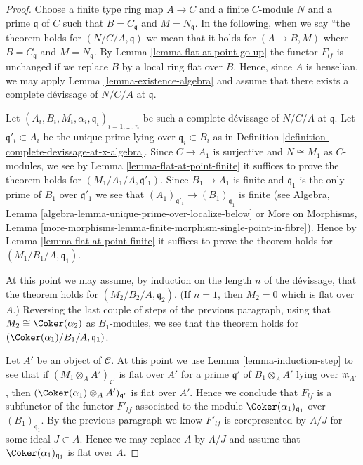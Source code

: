 \begin{proof}
Choose a finite type ring map $A \to C$ and a finite $C$-module $N$
and a prime $\mathfrak q$ of $C$ such that $B = C_{\mathfrak q}$
and $M = N_{\mathfrak q}$. In the following, when we say
``the theorem holds for $(N/C/A, \mathfrak q)$ we mean that
it holds for $(A \to B, M)$ where $B = C_{\mathfrak q}$ and
$M = N_{\mathfrak q}$. By
Lemma \ref{lemma-flat-at-point-go-up}
the functor $F_{lf}$ is unchanged if we replace $B$ by a local ring
flat over $B$. Hence, since $A$ is henselian, we may apply
Lemma \ref{lemma-existence-algebra}
and assume that there exists a complete d\'evissage of
$N/C/A$ at $\mathfrak q$.

\medskip\noindent
Let $(A_i, B_i, M_i, \alpha_i, \mathfrak q_i)_{i = 1, \ldots, n}$
be such a complete d\'evissage of $N/C/A$ at $\mathfrak q$. Let
$\mathfrak q'_i \subset A_i$ be the unique prime lying over
$\mathfrak q_i \subset B_i$ as in
Definition \ref{definition-complete-devissage-at-x-algebra}.
Since $C \to A_1$ is surjective and $N \cong M_1$ as $C$-modules,
we see by
Lemma \ref{lemma-flat-at-point-finite}
it suffices to prove the theorem holds for $(M_1/A_1/A, \mathfrak q'_1)$.
Since $B_1 \to A_1$ is finite and $\mathfrak q_1$ is the only prime
of $B_1$ over $\mathfrak q'_1$ we see that
$(A_1)_{\mathfrak q'_1} \to (B_1)_{\mathfrak q_1}$ is finite (see
Algebra, Lemma \ref{algebra-lemma-unique-prime-over-localize-below} or
More on Morphisms,
Lemma \ref{more-morphisms-lemma-finite-morphism-single-point-in-fibre}).
Hence by
Lemma \ref{lemma-flat-at-point-finite}
it suffices to prove the theorem holds for $(M_1/B_1/A, \mathfrak q_1)$.

\medskip\noindent
At this point we may assume, by induction on the length $n$ of the
d\'evissage, that the theorem holds for $(M_2/B_2/A, \mathfrak q_2)$.
(If $n = 1$, then $M_2 = 0$ which is flat over $A$.)
Reversing the last couple of steps of the previous paragraph, using
that $M_2 \cong \Coker(\alpha_2)$ as $B_1$-modules, we see
that the theorem holds for $(\Coker(\alpha_1)/B_1/A, \mathfrak q_1)$.

\medskip\noindent
Let $A'$ be an object of $\mathcal{C}$. At this point we use
Lemma \ref{lemma-induction-step}
to see that if $(M_1 \otimes_A A')_{\mathfrak q'}$ is flat
over $A'$ for a prime $\mathfrak q'$ of $B_1 \otimes_A A'$
lying over $\mathfrak m_{A'}$, then
$(\Coker(\alpha_1) \otimes_A A')_{\mathfrak q'}$ is flat over $A'$.
Hence we conclude that $F_{lf}$ is a subfunctor of the
functor $F'_{lf}$ associated to the module
$\Coker(\alpha_1)_{\mathfrak q_1}$ over $(B_1)_{\mathfrak q_1}$.
By the previous paragraph we know $F'_{lf}$ is corepresented by
$A/J$ for some ideal $J \subset A$. Hence we may replace $A$ by
$A/J$ and assume that $\Coker(\alpha_1)_{\mathfrak q_1}$ is
flat over $A$.


\end{proof}
